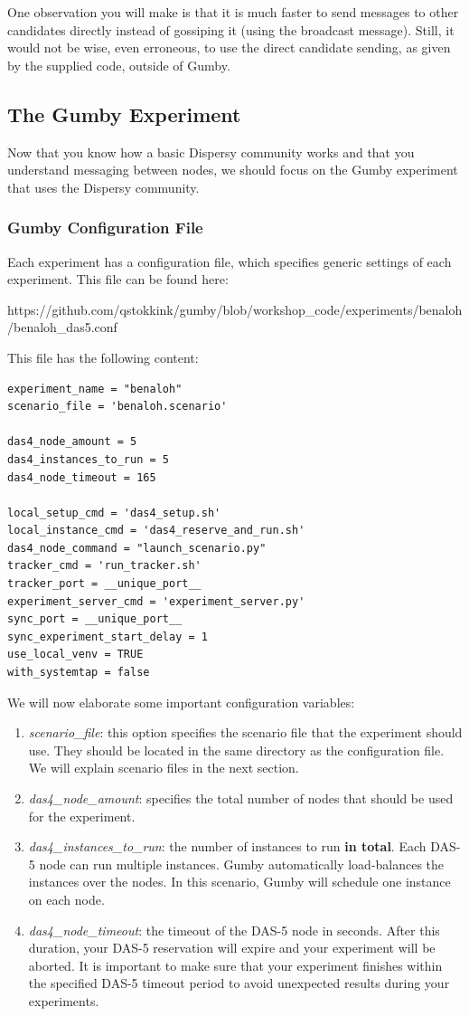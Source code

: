 \documentclass{article}
\begin{document}
One observation you will make is that it is much faster to send messages to other candidates directly instead of gossiping it (using the broadcast message).
Still, it would not be wise, even erroneous, to use the direct candidate sending, as given by the supplied code, outside of Gumby.

\subsection{The Gumby Experiment}
Now that you know how a basic Dispersy community works and that you understand messaging between nodes, we should focus on the Gumby experiment that uses the Dispersy community.

\subsubsection{Gumby Configuration File}
Each experiment has a configuration file, which specifies generic settings of each experiment.
This file can be found here:

https://github.com/qstokkink/gumby/blob/workshop\_code/experiments/benaloh/benaloh\_das5.conf

This file has the following content:

\begin{lstlisting}[frame=single]
experiment_name = "benaloh"
scenario_file = 'benaloh.scenario'

das4_node_amount = 5
das4_instances_to_run = 5
das4_node_timeout = 165

local_setup_cmd = 'das4_setup.sh'
local_instance_cmd = 'das4_reserve_and_run.sh'
das4_node_command = "launch_scenario.py"
tracker_cmd = 'run_tracker.sh'
tracker_port = __unique_port__
experiment_server_cmd = 'experiment_server.py'
sync_port = __unique_port__
sync_experiment_start_delay = 1
use_local_venv = TRUE
with_systemtap = false
\end{lstlisting}

We will now elaborate some important configuration variables:
\begin{enumerate}
	\item \emph{scenario\_file}: this option specifies the scenario file that the experiment should use. They should be located in the same directory as the configuration file. We will explain scenario files in the next section.
	\item \emph{das4\_node\_amount}: specifies the total number of nodes that should be used for the experiment.
	\item \emph{das4\_instances\_to\_run}: the number of instances to run \textbf{in total}. Each DAS-5 node can run multiple instances. Gumby automatically load-balances the instances over the nodes. In this scenario, Gumby will schedule one instance on each node.
	\item \emph{das4\_node\_timeout}: the timeout of the DAS-5 node in seconds. After this duration, your DAS-5 reservation will expire and your experiment will be aborted. It is important to make sure that your experiment finishes within the specified DAS-5 timeout period to avoid unexpected results during your experiments.
\end{enumerate}
\end{document}
